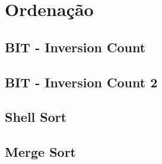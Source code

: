 \section{Ordenação}

\subsection{BIT - Inversion Count}


\subsection{BIT - Inversion Count 2}


\subsection{Shell Sort}


\subsection{Merge Sort}
